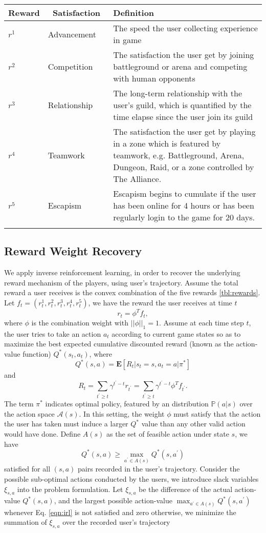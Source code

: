 \documentclass[a4paper]{article}
\begin{document}
\begin{tabular}{l|l|p{9cm}}
    \toprule
    Reward  &~Satisfaction~ & Definition \\
    \midrule
    $r^1$ & Advancement & The speed the user collecting experience in game \\
    $r^2$ & Competition & The satisfaction the user get by joining battleground or arena and competing with human opponents \\
    $r^3$ & Relationship & The long-term relationship with the user's guild, which is quantified by the time elapse since the user join its guild \\
    $r^4$ & Teamwork & The satisfaction the user get by playing in a zone which is featured by teamwork, e.g. Battleground, Arena, Dungeon, Raid, or a zone controlled by The Alliance. \\
    $r^5$ & Escapism & Escapism begins to cumulate if the user has been online for 4 hours or has been regularly login to the game for 20 days. \\
    \bottomrule
    \label{tbl:rewards}
\end{tabular}

\subsection{Reward Weight Recovery}

We apply inverse reinforcement learning, in order to recover the underlying reward mechanism of the players, using user's trajectory. Assume the total reward a user receives is the convex combination of the five rewards \ref{tbl:rewards}. Let $f_t=(r_t^1,r_t^2,r_t^3,r_t^4,r_t^5)$, we have the reward the user receives at time $t$ $$r_t=\phi^Tf_t,$$ 
where $\phi$ is the combination weight with $||\phi||_1=1$. Assume at each time step $t$, the user tries to take an action $a_t$ according to current game states so as to maximize the best expected cumulative discounted reward (known as the action-value function) $Q^\ast(s_t, a_t)$, where
$$Q^\ast(s,a)=\mathbf{E}[R_t | s_{t}=s, a_{t}=a | \pi^\ast]$$
and
$$R_t=\sum_{t^\prime\geq t}\gamma^{t^\prime-t}r_{t^\prime}=\sum_{t^\prime\geq t}\gamma^{t^\prime-t}\phi^Tf_{t^\prime}.$$
The term $\pi^\ast$ indicates optimal policy, featured by an distribution $\mathbb{P}(a|s)$ over the action space $\mathcal{A}(s)$. In this setting, the weight $\phi$ must satisfy that the action the user has taken must induce a larger $Q^\ast$ value than any other valid action would have done. Define $A(s)$ as the set of feasible action under state $s$, we have
$$Q^\ast(s,a) \geq \max_{a^\prime \in A(s)}Q^\ast(s,a^\prime) \label{eqn:irl}$$ 
satisfied for all $(s,a)$ pairs recorded in the user's trajectory. Consider the possible sub-optimal actions conducted by the users, we introduce slack variables $\xi_{s,a}$ into the problem formulation. Let $\xi_{s,a}$ be the difference of the actual action-value $Q^\ast(s,a)$, and the largest possible action-value $\max_{a^\prime \in A(s)}Q^\ast(s,a^\prime)$ whenever Eq. \eqref{eqn:irl} is not satisfied and zero otherwise, we minimize the summation of $\xi_{s,a}$ over the recorded user's trajectory
\end{document}

